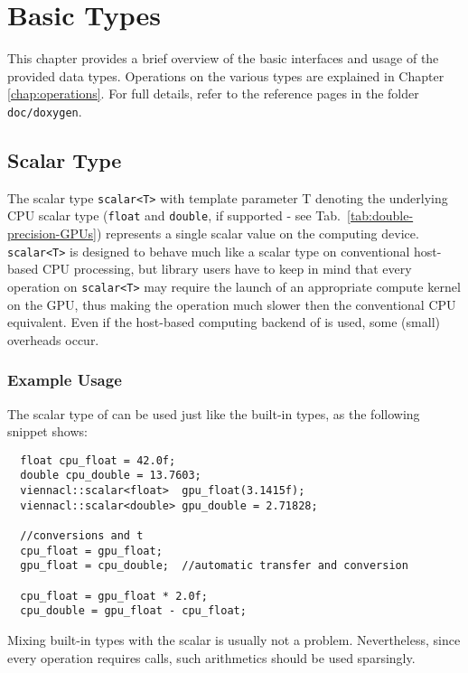 \chapter{Basic Types} \label{chap:basic-types}
This chapter provides a brief overview of the basic interfaces and usage of the
provided data types. Operations on the various types are explained in
Chapter \ref{chap:operations}. For full details, refer to the reference pages
in the folder \texttt{doc/doxygen}.

\section {Scalar Type}
The scalar type \lstinline|scalar<T>| with template parameter T
denoting the underlying CPU scalar type (\lstinline|float| and \lstinline|double|, if supported - see Tab.~\ref{tab:double-precision-GPUs}) represents a
single scalar value on the computing device. \lstinline|scalar<T>| is designed to behave much
like a scalar type on conventional host-based CPU processing, but library users have to keep in mind that
every operation on \lstinline|scalar<T>| may require the launch of an appropriate
compute kernel on the GPU, thus making the operation much slower then the conventional CPU equivalent.
Even if the host-based computing backend of {\ViennaCL} is used, some (small) overheads occur.


\subsection{Example Usage}
The scalar type of {\ViennaCL} can be used just like the built-in
types, as the following snippet shows:
\begin{lstlisting}
  float cpu_float = 42.0f;
  double cpu_double = 13.7603;
  viennacl::scalar<float>  gpu_float(3.1415f);
  viennacl::scalar<double> gpu_double = 2.71828;

  //conversions and t
  cpu_float = gpu_float;  
  gpu_float = cpu_double;  //automatic transfer and conversion

  cpu_float = gpu_float * 2.0f; 
  cpu_double = gpu_float - cpu_float;
\end{lstlisting}
Mixing built-in types with the {\ViennaCL} scalar is usually not a
problem. Nevertheless, since every operation requires {\OpenCL} calls, such
arithmetics should be used sparsingly.

